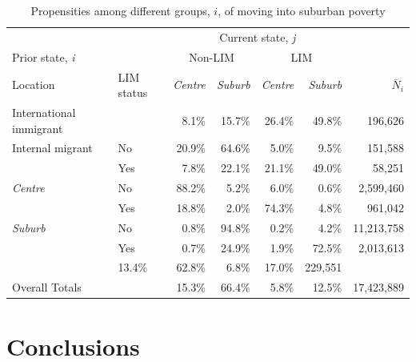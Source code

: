 \begin{table}[h]
	\small
	\centering
	\caption{Propensities among different groups, $i$, of moving into suburban poverty}
	\label{table:pji}
	\begin{tabular}{llrrrrr}
		\hline 
		\multicolumn{2}{c}{}                        & \multicolumn{4}{c}{Current state, \textit{j}}   &               \\
		\multicolumn{2}{l}{Prior state, \textit{i}}          & \multicolumn{2}{c}{Non-LIM} & \multicolumn{2}{c}{LIM}  & \\ 
		Location                  & LIM status      & \textit{Centre}       & \textit{Suburb}       & \textit{Centre}      & \textit{Suburb}  & $\bar{N}_i$  \\ \hline
		International immigrant & & 8.1\%        & 15.7\%       & 26.4\%      & 49.8\%  &  196,626 \\ 
		\arrayrulecolor{lightgray}\hline
		Internal migrant        & No              & 20.9\%       & 64.6\%       & 5.0\%       & 9.5\% &  151,588   \\
		& Yes             & 7.8\%        & 22.1\%       & 21.1\%      & 49.0\%  &  58,251 \\
		\arrayrulecolor{lightgray}\hline
		\textit{Centre}                    & No              & 88.2\%       & 5.2\%        & 6.0\%       & 0.6\%  &  2,599,460  \\
		& Yes             & 18.8\%       & 2.0\%        & 74.3\%      & 4.8\%  & 961,042   \\
		\arrayrulecolor{lightgray}\hline
		\textit{Suburb}                    & No              & 0.8\%        & 94.8\%       & 0.2\%       & 4.2\%  & 11,213,758   \\
		& Yes             & 0.7\%        & 24.9\%       & 1.9\%       & 72.5\%   & 2,013,613 \\
		\arrayrulecolor{lightgray}\hline
		\multicolumn{2}{l}{Births}                  & 13.4\%       & 62.8\%       & 6.8\%       & 17.0\% & 229,551   \\ \arrayrulecolor{black}\hline
		Overall Totals            &                 & 15.3\%       & 66.4\%       & 5.8\%       & 12.5\%  & 17,423,889 \\ \hline
	\end{tabular}
\end{table}



\section{Conclusions}

